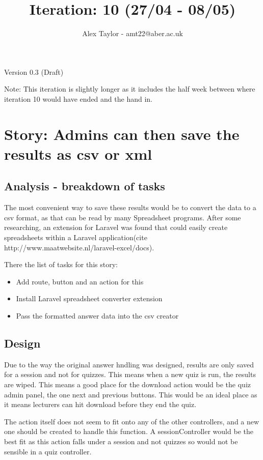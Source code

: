 \documentclass{article}
\title{Iteration: 10 (27/04 - 08/05)}
\author{Alex Taylor - amt22@aber.ac.uk}
\begin{document}
\maketitle
\begin{center}
	Version 0.3 (Draft)
\end{center}
\tableofcontents
\thispagestyle{empty}
\newpage

Note: This iteration is slightly longer as it includes the half week between where iteration 10 would have ended and the hand in.

\section{Story: Admins can then save the results as csv or xml}
\subsection{Analysis - breakdown of tasks}
The most convenient way to save these results would be to convert the data to a csv format, as that can be read by many Spreadsheet programs. After some researching, an extension for Laravel was found that could easily create spreadsheets within a Laravel application(cite http://www.maatwebsite.nl/laravel-excel/docs).

There the list of tasks for this story:
\begin{itemize}
	\item Add route, button and an action for this
	\item Install Laravel spreadsheet converter extension
	\item Pass the formatted answer data into the csv creator
\end{itemize}
\subsection{Design}
Due to the way the original answer hndling was designed, results are only saved for a session and not for quizzes. This means when a new quiz is run, the results are wiped. This means a good place for the download action would be the quiz admin panel, the one next and previous buttons. This would be an ideal place as it means lecturers can hit download before they end the quiz.

The action itself does not seem to fit onto any of the other controllers, and a new one should be created to handle this function. A sessionController would be the best fit as this action falls under a session and not quizzes so would not be sensible in a quiz controller.
\end{document}
